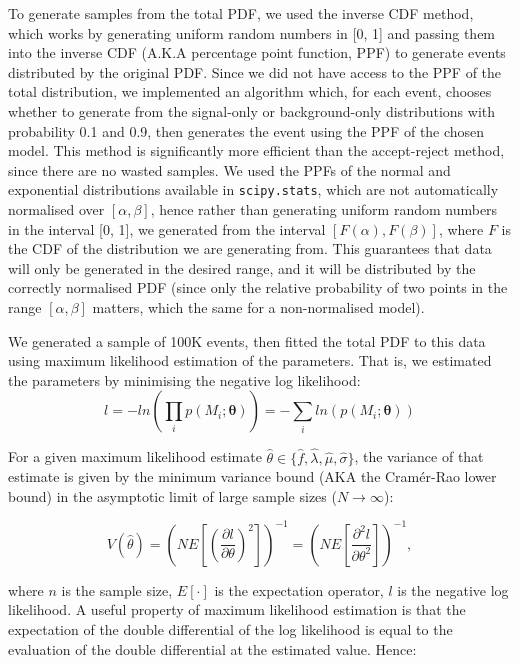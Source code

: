 \documentclass{article}
\begin{document}
To generate samples from the total PDF, we used the inverse CDF method, which works by generating uniform random numbers in [0, 1] and passing them into the inverse CDF (A.K.A percentage point function, PPF) to generate events distributed by the original PDF. Since we did not have access to the PPF of the total distribution, we implemented an algorithm which, for each event, chooses whether to generate from the signal-only or background-only distributions with probability 0.1 and 0.9, then generates the event using the PPF of the chosen model. This method is significantly more efficient than the accept-reject method, since there are no wasted samples. We used the PPFs of the normal and exponential distributions available in \texttt{scipy.stats}, which are not automatically normalised over $[\alpha, \beta]$, hence rather than generating uniform random numbers in the interval [0, 1], we generated from the interval $[F(\alpha), F(\beta)]$, where $F$ is the CDF of the distribution we are generating from. This guarantees that data will only be generated in the desired range, and it will be distributed by the correctly normalised PDF (since only the relative probability of two points in the range $[\alpha, \beta]$ matters, which the same for a non-normalised model).

We generated a sample of 100K events, then fitted the total PDF to this data using maximum likelihood estimation of the parameters. That is, we estimated the parameters by minimising the negative log likelihood:
\begin{equation}
l
= -ln\left(\prod_i p(M_i; \boldsymbol{\theta})\right)
= -\sum_i ln(p(M_i; \boldsymbol{\theta}))
\label{eq:nll}
\end{equation}

For a given maximum likelihood estimate $\hat{\theta} \in \{\hat{f}, \hat{\lambda}, \hat{\mu}, \hat{\sigma} \}$, the variance of that estimate is given by the minimum variance bound (AKA the Cramér-Rao lower bound) in the asymptotic limit of large sample sizes ($N \to \infty$):

\begin{equation}
V(\hat{\theta}) 
= \left( {NE\left[\left(\frac{{\partial}l}{{\partial\theta}}\right)^2\right]} \right) ^{-1}
= \left( {NE\left[\frac{{\partial^2}l}{{\partial\theta^2}}\right]} \right)^{-1},
\label{eq:varbound}
\end{equation}

where $n$ is the sample size, $E[\cdot]$ is the expectation operator, $l$ is the negative log likelihood. A useful property of maximum likelihood estimation is that the expectation of the double differential of the log likelihood is equal to the evaluation of the double differential at the estimated value. Hence:
\end{document}
